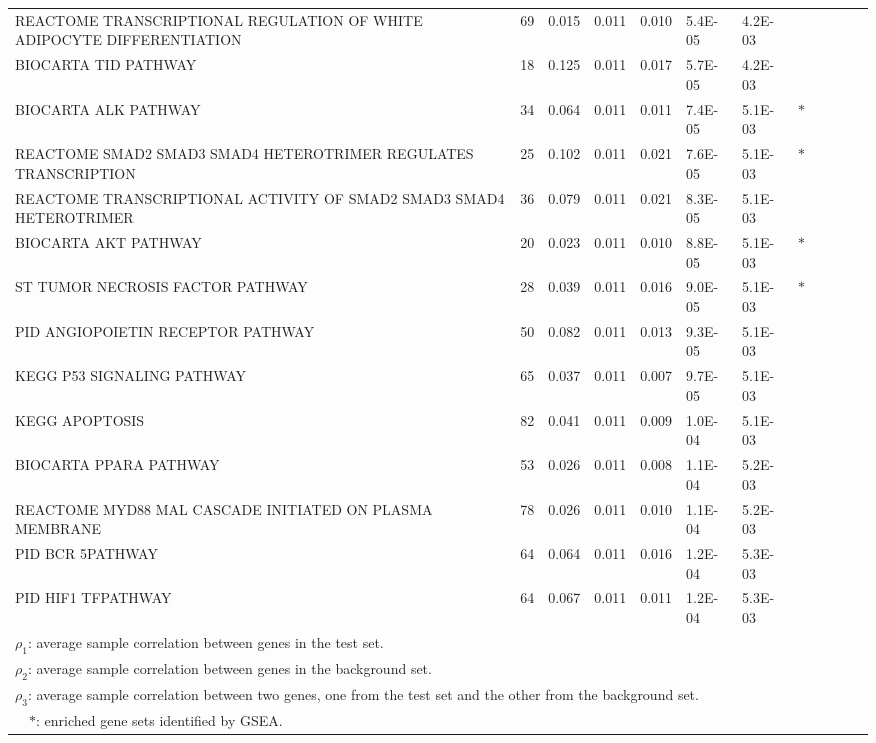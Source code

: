\documentclass[useAMS,usenatbib, galley]{biom}
\begin{document}
\begin{table*}[!ht]
\begin{tabular}{p{3in}rp{0.5in}p{0.5in}rp{0.5in}p{0.5in}rp{0.5in}p{0.5in}lp{0.1in}}
			REACTOME TRANSCRIPTIONAL REGULATION OF WHITE ADIPOCYTE DIFFERENTIATION & 69 & 0.015 & 0.011 & 0.010 & 5.4E-05 & 4.2E-03 &  \\ 
			BIOCARTA TID PATHWAY & 18 & 0.125 & 0.011 & 0.017 & 5.7E-05 & 4.2E-03 &  \\ 
			BIOCARTA ALK PATHWAY & 34 & 0.064 & 0.011 & 0.011 & 7.4E-05 & 5.1E-03 & $\ast$ \\ 
			REACTOME SMAD2 SMAD3 SMAD4 HETEROTRIMER REGULATES TRANSCRIPTION & 25 & 0.102 & 0.011 & 0.021 & 7.6E-05 & 5.1E-03 & $\ast$ \\ 
			REACTOME TRANSCRIPTIONAL ACTIVITY OF SMAD2 SMAD3 SMAD4 HETEROTRIMER & 36 & 0.079 & 0.011 & 0.021 & 8.3E-05 & 5.1E-03 &  \\ 
			BIOCARTA AKT PATHWAY & 20 & 0.023 & 0.011 & 0.010 & 8.8E-05 & 5.1E-03 & $\ast$ \\ 
			ST TUMOR NECROSIS FACTOR PATHWAY & 28 & 0.039 & 0.011 & 0.016 & 9.0E-05 & 5.1E-03 & $\ast$ \\ 
			PID ANGIOPOIETIN RECEPTOR PATHWAY & 50 & 0.082 & 0.011 & 0.013 & 9.3E-05 & 5.1E-03 &  \\ 
			KEGG P53 SIGNALING PATHWAY & 65 & 0.037 & 0.011 & 0.007 & 9.7E-05 & 5.1E-03 &  \\ 
			KEGG APOPTOSIS & 82 & 0.041 & 0.011 & 0.009 & 1.0E-04 & 5.1E-03 &  \\ 
			BIOCARTA PPARA PATHWAY & 53 & 0.026 & 0.011 & 0.008 & 1.1E-04 & 5.2E-03 &  \\ 
			REACTOME MYD88 MAL CASCADE INITIATED ON PLASMA MEMBRANE & 78 & 0.026 & 0.011 & 0.010 & 1.1E-04 & 5.2E-03 &  \\ 
			PID BCR 5PATHWAY & 64 & 0.064 & 0.011 & 0.016 & 1.2E-04 & 5.3E-03 &  \\ 
			PID HIF1 TFPATHWAY & 64 & 0.067 & 0.011 & 0.011 & 1.2E-04 & 5.3E-03 &  \\ 
			\hline\hline
			\multicolumn{7}{l}{$\rho_1$: average sample correlation between genes in the test set. }	 \\	
			\multicolumn{7}{l}{$\rho_2$: average sample correlation between genes in the background set. }	 \\	
			\multicolumn{7}{l}{$\rho_3$: average sample correlation between two genes, one from the test set and the other from the background set. }	 \\	
			\multicolumn{7}{l}{ ~~$\ast$: enriched gene sets identified by GSEA.}	 \\	
	\end{tabular}
	\label{table:top30}
\end{table*}
\end{document}
